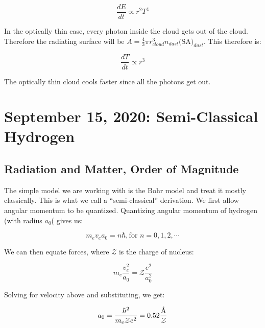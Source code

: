 \documentclass{article}
\newcommand{\angstrom}{\mbox{\normalfont\AA}}
\begin{document}
\begin{equation}
    \frac{dE}{dt} \propto r^2 T^4
\end{equation}

In the optically thin case, every photon inside the cloud gets out of the cloud. Therefore the radiating surface will be $A = \frac{4}{3}\pi r^3_{cloud} n_{dust} \text{(SA)}_{dust}$. This therefore is:

\begin{equation}
    \frac{dT}{dt} \propto r^3
\end{equation}

The optically thin cloud cools faster since all the photons get out. 

\newpage
\section{September 15, 2020: Semi-Classical Hydrogen}

\subsection{Radiation and Matter, Order of Magnitude}

The simple model we are working with is the Bohr model and treat it mostly classically. This is what we call a ``semi-classical'' derivation. We first allow angular momentum to be quantized. Quantizing angular momentum of hydrogen (with radius $a_0$( gives us:

\begin{equation}
    m_e v_e a_0 = n \hbar, \text{for } n = 0,1,2,\cdots
\end{equation}

We can then equate forces, where $\mathcal{Z}$ is the charge of nucleus:

\begin{equation}
    m_e \frac{v_e^2}{a_0} = \mathcal{Z}\frac{e^2}{a_0^2}
\end{equation}

Solving for velocity above and substituting, we get:

\begin{equation}
    a_0 = \frac{\hbar^2}{m_e \mathcal{Z} e^2} = 0.52 \frac{\angstrom}{\mathcal{Z}}
\end{equation}
\end{document}
